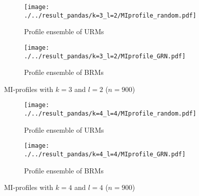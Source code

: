 \documentclass[../main.tex]{subfiles}
\begin{document}
\begin{figure}[ht]
    \centering
    \begin{subfigure}[b]{0.4\textwidth}
        \texttt{[image: ./../result\_pandas/k=3\_l=2/MIprofile\_random.pdf]}
        \caption{Profile ensemble of URMs}
    \end{subfigure}
    \begin{subfigure}[b]{0.4\textwidth}
        \texttt{[image: ./../result\_pandas/k=3\_l=2/MIprofile\_GRN.pdf]}
        \caption{Profile ensemble of BRMs}
    \end{subfigure}
    \caption{MI-profiles with $k=3$ and $l=2$ ($n=900$)}
    \label{fig:profilel2}
\end{figure}

\begin{figure}[ht]
    \centering
    \begin{subfigure}[b]{0.4\textwidth}
        \texttt{[image: ./../result\_pandas/k=4\_l=4/MIprofile\_random.pdf]}
        \caption{Profile ensemble of URMs}
    \end{subfigure}
    \begin{subfigure}[b]{0.4\textwidth}
        \texttt{[image: ./../result\_pandas/k=4\_l=4/MIprofile\_GRN.pdf]}
        \caption{Profile ensemble of BRMs}
    \end{subfigure}
    \caption{MI-profiles with $k=4$ and $l=4$ ($n=900$)}
    \label{fig:profilel4}
\end{figure}
\end{document}
